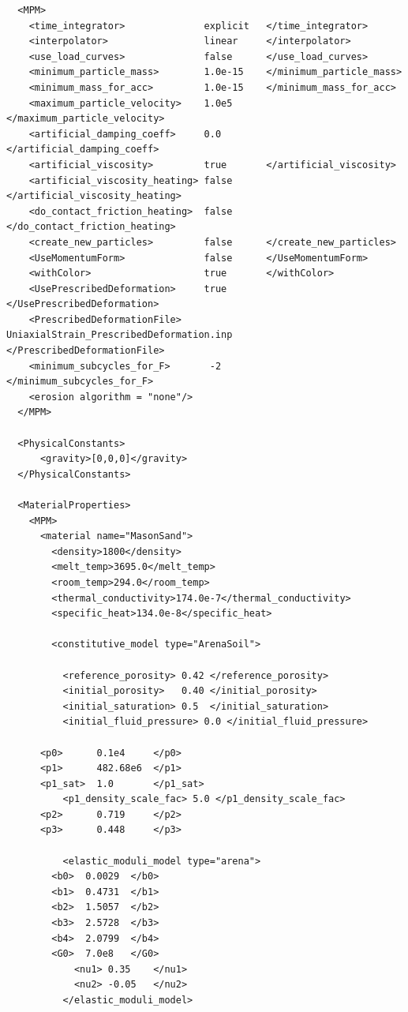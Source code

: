 \documentclass[11pt,a4paper]{article}
\begin{document}
\begin{lstlisting}
  <MPM>
    <time_integrator>              explicit   </time_integrator>
    <interpolator>                 linear     </interpolator>
    <use_load_curves>              false      </use_load_curves>
    <minimum_particle_mass>        1.0e-15    </minimum_particle_mass>
    <minimum_mass_for_acc>         1.0e-15    </minimum_mass_for_acc>
    <maximum_particle_velocity>    1.0e5      </maximum_particle_velocity>
    <artificial_damping_coeff>     0.0        </artificial_damping_coeff>
    <artificial_viscosity>         true       </artificial_viscosity>
    <artificial_viscosity_heating> false      </artificial_viscosity_heating>
    <do_contact_friction_heating>  false      </do_contact_friction_heating>
    <create_new_particles>         false      </create_new_particles>
    <UseMomentumForm>              false      </UseMomentumForm>
    <withColor>                    true       </withColor>
    <UsePrescribedDeformation>     true       </UsePrescribedDeformation>
    <PrescribedDeformationFile>    UniaxialStrain_PrescribedDeformation.inp   </PrescribedDeformationFile>
    <minimum_subcycles_for_F>       -2        </minimum_subcycles_for_F>
    <erosion algorithm = "none"/>
  </MPM>

  <PhysicalConstants>
      <gravity>[0,0,0]</gravity>
  </PhysicalConstants>

  <MaterialProperties>
    <MPM>
      <material name="MasonSand">
        <density>1800</density>
        <melt_temp>3695.0</melt_temp>
        <room_temp>294.0</room_temp>
        <thermal_conductivity>174.0e-7</thermal_conductivity>
        <specific_heat>134.0e-8</specific_heat>

        <constitutive_model type="ArenaSoil">

          <reference_porosity> 0.42 </reference_porosity>
          <initial_porosity>   0.40 </initial_porosity>
          <initial_saturation> 0.5  </initial_saturation>
          <initial_fluid_pressure> 0.0 </initial_fluid_pressure>

	  <p0>      0.1e4     </p0>
	  <p1>      482.68e6  </p1>
	  <p1_sat>  1.0       </p1_sat>
          <p1_density_scale_fac> 5.0 </p1_density_scale_fac>
	  <p2>      0.719     </p2>
	  <p3>      0.448     </p3>

          <elastic_moduli_model type="arena">
	    <b0>  0.0029  </b0>
	    <b1>  0.4731  </b1>
	    <b2>  1.5057  </b2>
	    <b3>  2.5728  </b3>
	    <b4>  2.0799  </b4>
	    <G0>  7.0e8   </G0>
            <nu1> 0.35    </nu1>
            <nu2> -0.05   </nu2>
          </elastic_moduli_model>


\end{lstlisting}
\end{document}
